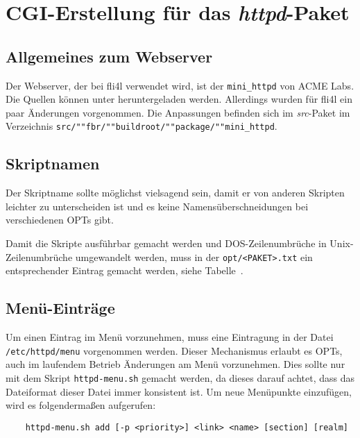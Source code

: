 
\section{CGI-Erstellung für das \emph{httpd}-Paket}

\subsection{Allgemeines zum Webserver}
Der Webserver, der bei fli4l verwendet wird, ist der \texttt{mini\_httpd} von ACME
Labs. Die Quellen können unter
 heruntergeladen werden.
Allerdings wurden für fli4l ein paar Änderungen vorgenommen. 
Die Anpassungen befinden sich im \emph{src}-Paket im Verzeichnis
\texttt{src/""fbr/""buildroot/""package/""mini\_httpd}.

\subsection{Skriptnamen}

Der Skriptname sollte möglichst vielsagend sein, damit er von
anderen Skripten leichter zu unterscheiden ist und es keine
Namensüberschneidungen bei verschiedenen OPTs gibt.

Damit die Skripte ausführbar gemacht werden und DOS-Zeilenumbrüche in
Unix-Zeilen\-um\-brüche umgewandelt werden, muss in der \texttt{opt/<PAKET>.txt}
ein entsprechender Eintrag gemacht werden, siehe
Tabelle~.

\subsection{Menü-Einträge}

Um einen Eintrag im Menü vorzunehmen, muss eine Eintragung in der Datei
\texttt{/etc/httpd/menu} vorgenommen werden. Dieser Mechanismus erlaubt es OPTs,
auch im laufendem Betrieb Änderungen am Menü vorzunehmen. Dies sollte nur mit
dem Skript \texttt{httpd-menu.sh} gemacht werden, da dieses darauf achtet, dass
das Dateiformat dieser Datei immer konsistent ist. Um neue Menüpunkte
einzufügen, wird es folgendermaßen aufgerufen:

\begin{example}
\begin{verbatim}
    httpd-menu.sh add [-p <priority>] <link> <name> [section] [realm]
\end{verbatim}
\end{example}

